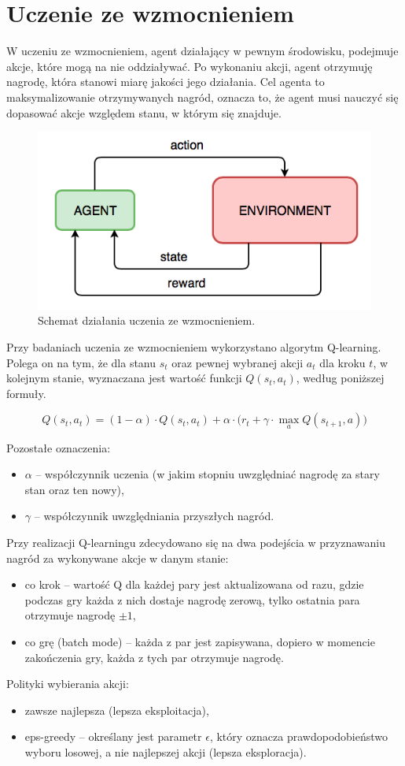 \section{Uczenie ze wzmocnieniem}

W uczeniu ze wzmocnieniem, agent działający w pewnym środowisku, podejmuje akcje, które mogą na nie oddziaływać. Po wykonaniu akcji, agent otrzymuję nagrodę, która stanowi miarę jakości jego działania. Cel agenta to maksymalizowanie otrzymywanych nagród, oznacza to, że agent musi nauczyć się dopasować akcje względem stanu, w którym się znajduje.

\begin{figure}[H]
	\centering
	\includegraphics[width=0.7\linewidth]{imgs/rl}
	\caption{Schemat działania uczenia ze wzmocnieniem.}
	\label{fig:rl}
\end{figure}

Przy badaniach uczenia ze wzmocnieniem wykorzystano algorytm Q-learning. Polega on na tym, że dla stanu $s_{t}$ oraz pewnej wybranej akcji $a_{t}$ dla kroku $t$, w kolejnym stanie, wyznaczana jest wartość funkcji $Q(s_{t}, a_{t})$, według poniższej formuły.

$$Q(s_{t}, a_{t}) = (1 - \alpha) \cdot Q(s_{t}, a_{t}) + \alpha \cdot \Big( r_{t} + \gamma \cdot \max_{a} Q(s_{t + 1}, a) \Big)$$

Pozostałe oznaczenia:
\begin{itemize}
	\item $\alpha$ -- współczynnik uczenia (w jakim stopniu uwzględniać nagrodę za stary stan oraz ten nowy),
	\item $\gamma$ -- współczynnik uwzględniania przyszłych nagród.
\end{itemize}

Przy realizacji Q-learningu zdecydowano się na dwa podejścia w przyznawaniu nagród za wykonywane akcje w danym stanie:

\begin{itemize}
	\item co krok -- wartość Q dla każdej pary jest aktualizowana od razu, gdzie podczas gry każda z nich dostaje nagrodę zerową, tylko ostatnia para otrzymuje nagrodę $\pm 1$,
	\item co grę (batch mode) -- każda z par jest zapisywana, dopiero w momencie zakończenia gry, każda z tych par otrzymuje nagrodę.
\end{itemize}

Polityki wybierania akcji:
\begin{itemize}
	\item zawsze najlepsza (lepsza eksploitacja),
	\item eps-greedy -- określany jest parametr $\epsilon$, który oznacza prawdopodobieństwo wyboru losowej, a nie najlepszej akcji (lepsza eksploracja).
\end{itemize}

\pagebreak